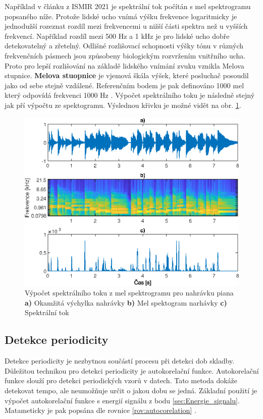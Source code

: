   Například v článku z \acs{ISMIR} 2021 \cite{tempobeatdownbeat:book} je spektrální tok počítán s mel spektrogramu popsaného níže.
  Protože lidské ucho vnímá výšku frekvence logaritmicky je jednodužší rozeznat rozdíl mezi frekvencemi u nižší části spektra než u vyšších frekvencí.
  Například rozdíl mezi 500 Hz a 1 kHz je pro lidské ucho dobře detekovatelný a zřetelný.
  Odlišné rozlišovací schopnosti výšky tónu v různých frekvenčních pásmech jsou způsobeny biologickým rozvržením vnitřního ucha. Proto pro lepší rozlišování na základě lidského vnímání zvuku vznikla Melova stupnice.
  \textbf{Melova stuopnice} je vjemová škála výšek, které posluchač posoudil jako od sebe stejně vzdálené. Referenčním bodem je pak definováno 1000 mel který odpovídá frekvenci 1000 Hz \cite{StevensS.S1937ASft}.
  Výpočet spektrálního toku je následně stejný jak pří výpočtu ze spektogramu. Výslednou křivku je možné vidět na obr. \ref{fig:Mel_spectralni_tok}.

  \begin{figure}[H]
    \centering
    \includegraphics[width = 0.8\linewidth]{obrazky/Mel_spektralni_tok.eps}
    \caption{Výpočet spektrálního toku z mel spektrogramu pro nahrávku piana \textbf{a)} Okamžitá výchylka nahrávky \textbf{b)} Mel spektogram narhávky \textbf{c)} Spektrální tok}
    \label{fig:Mel_spectralni_tok}
  \end{figure}


  \subsection{Detekce periodicity}
    Detekce periodicity je nezbytnou součástí procesu při detekci dob skladby.
    Důležitou technikou pro detekci periodicity je autokorelační funkce.
    Autokorelační funkce slouží pro detekci periodických vzorů v datech.
    Tato metoda dokáže detekovat tempo, ale neumožňuje určit o jakou dobu se jedná.
    Základní použití je výpočet autokorelační funkce s energií signálu z bodu \ref{sec:Energie_signalu}. Matameticky je pak popsána dle rovnice \ref{rov:autocorelation} \cite{Signal_processing_methods_for_music_transcription}.

